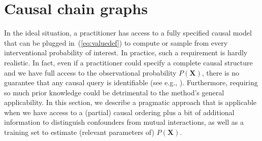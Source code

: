 \documentclass{article}
\newcommand{\vX}{\mathbf{X}}
\newcommand{\expectation}{\mathbb{E}}
\newcommand{\dodo}{\mathit{do}}
\newcommand{\ldo}[1]{\dodo(X_{#1} = x_{#1})}
\begin{document}
%


\section{Causal chain graphs}

In the ideal situation, a practitioner has access to a fully specified causal model that can be plugged in~(\ref{eq:valuedef}) to compute or sample from every interventional probability of interest. In practice, such a requirement is hardly realistic. In fact, even if a practitioner could specify a complete causal structure and we have full access to the observational probability $P(\vX)$, there is no guarantee that any causal query is identifiable (see e.g., \cite{pearl2012calculus}). Furthermore, requiring so much prior knowledge could be detrimental to the method's general applicability.
%
%
%
In this section, we describe a pragmatic approach that is applicable when we have access to a (partial) causal ordering plus a bit of additional information to distinguish confounders from mutual interactions, as well as a training set to estimate (relevant parameters of) $P(\vX)$.
\end{document}

